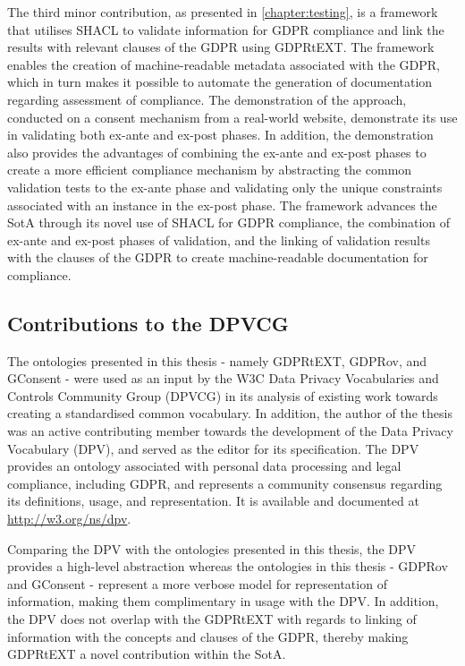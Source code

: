 The third minor contribution, as presented in \autoref{chapter:testing}, is a framework that utilises SHACL to validate information for GDPR compliance and link the results with relevant clauses of the GDPR using GDPRtEXT. 
The framework enables the creation of machine-readable metadata associated with the GDPR, which in turn makes it possible to automate the generation of documentation regarding assessment of compliance.
The demonstration of the approach, conducted on a consent mechanism from a real-world website, demonstrate its use in validating both ex-ante and ex-post phases.
In addition, the demonstration also provides the advantages of combining the ex-ante and ex-post phases to create a more efficient compliance mechanism by abstracting the common validation tests to the ex-ante phase and validating only the unique constraints associated with an instance in the ex-post phase.
The framework advances the SotA through its novel use of SHACL for GDPR compliance, the combination of ex-ante and ex-post phases of validation, and the linking of validation results with the clauses of the GDPR to create machine-readable documentation for compliance.

\subsection*{Contributions to the DPVCG}
The ontologies presented in this thesis - namely GDPRtEXT, GDPRov, and GConsent - were used as an input by the W3C Data Privacy Vocabularies and Controls Community Group (DPVCG) in its analysis of existing work towards creating a standardised common vocabulary.
In addition, the author of the thesis was an active contributing member towards the development of the Data Privacy Vocabulary (DPV), and served as the editor for its specification.
The DPV provides an ontology associated with personal data processing and legal compliance, including GDPR, and represents a community consensus regarding its definitions, usage, and representation.
It is available and documented at \url{http://w3.org/ns/dpv}.

Comparing the DPV with the ontologies presented in this thesis, the DPV provides a high-level abstraction whereas the ontologies in this thesis - GDPRov and GConsent - represent a more verbose model for representation of information, making them complimentary in usage with the DPV.
In addition, the DPV does not overlap with the GDPRtEXT with regards to linking of information with the concepts and clauses of the GDPR, thereby making GDPRtEXT a novel contribution within the SotA.

